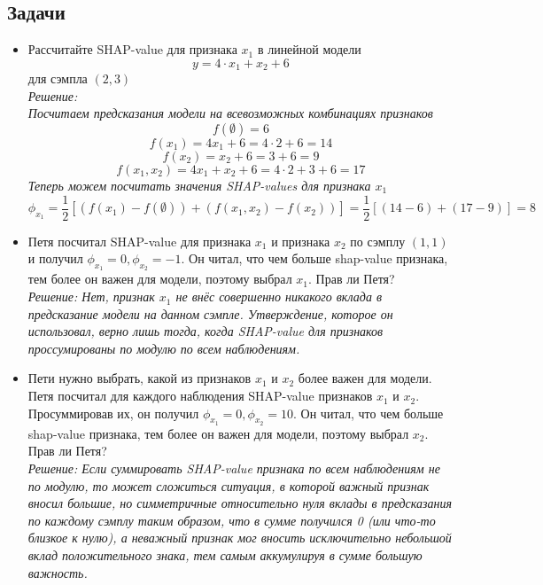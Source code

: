 \subsection*{Задачи}
\begin{itemize}
    \item Рассчитайте SHAP-value для признака $x_1$ в линейной модели
          $$y = 4 \cdot x_1 + x_2 + 6$$ для сэмпла $(2, 3)$\\
          \textit{Решение:\\
              Посчитаем предсказания модели на всевозможных комбинациях признаков
              $$ f(\emptyset) = 6 $$
              $$ f(x_1) = 4x_1 + 6 = 4 \cdot 2 + 6 = 14 $$
              $$ f(x_2) = x_2 + 6 = 3 + 6 = 9 $$
              $$ f(x_1, x_2) = 4x_1 + x_2 + 6 = 4 \cdot 2 + 3 + 6 = 17 $$
              Теперь можем посчитать значения SHAP-values для признака $x_1$
              $$
                  \phi_{x_1} = \frac{1}{2} \left[ (f(x_1) - f(\emptyset)) + (f(x_1, x_2) - f(x_2)) \right] = \frac{1}{2} \left[ (14 - 6) + (17 - 9)\right] = \boxed{8}
              $$}
    \item Петя посчитал SHAP-value для признака $x_1$ и признака $x_2$ по сэмплу $(1, 1)$ и получил $\phi_{x_1} = 0, \phi_{x_2} = -1$. Он читал, что чем больше shap-value признака, тем более он важен для модели, поэтому выбрал $x_1$. Прав ли Петя?\\
          \textit{Решение: Нет, признак $x_1$ не внёс совершенно никакого вклада в предсказание модели на данном сэмпле. Утверждение, которое он использовал, верно лишь тогда, когда SHAP-value для признаков проссумированы по модулю по всем наблюдениям.}
    \item Пети нужно выбрать, какой из признаков $x_1$ и $x_2$ более важен для модели. Петя посчитал для каждого наблюдения SHAP-value признаков $x_1$ и $x_2$. Просуммировав их, он получил $\phi_{x_1} = 0, \phi_{x_2} = 10$. Он читал, что чем больше shap-value признака, тем более он важен для модели, поэтому выбрал $x_2$. Прав ли Петя?\\
          \textit{Решение: Если суммировать SHAP-value признака по всем наблюдениям не по модулю, то может сложиться ситуация, в которой важный признак вносил большие, но симметричные относительно нуля вклады в предсказания по каждому сэмплу таким образом, что в сумме получился 0 (или что-то близкое к нулю), а неважный признак мог вносить исключительно небольшой вклад положительного знака, тем самым аккумулируя в сумме большую важность.}
\end{itemize}


